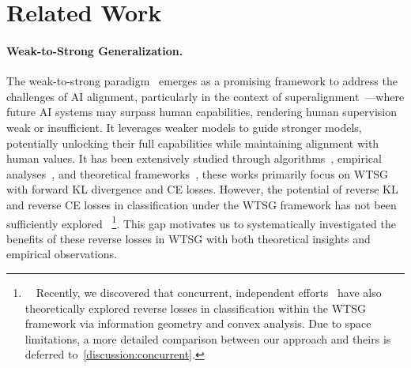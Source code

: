 \section{Related Work}

\paragraph{Weak-to-Strong Generalization.}
The weak-to-strong paradigm~\citep{burns2023weak} emerges as a promising framework to address the challenges of AI alignment, particularly in the context of superalignment~\citep{openai_superalignment}—where future AI systems may surpass human capabilities, rendering human supervision weak or insufficient. 
It leverages weaker models to guide stronger models, potentially unlocking their full capabilities while maintaining alignment with human values.
It has been extensively studied through algorithms~\citep{zhu2024weak,agrawal2024ensemw2s,sang2024improving,guo2024improving}, empirical analyses~\citep{yang2024super,ye2024weak}, and theoretical frameworks~\citep{lang2024theoretical,somerstep2024statistical,wu2024provable,charikar2024quantifying,yao2025understanding}, these works primarily focus on WTSG with forward KL divergence and CE losses. 
However, the potential of reverse KL and reverse CE losses in classification under the WTSG framework has not been sufficiently explored~\textsuperscript{\textdagger}
\footnote{\textdagger \ \ Recently, we discovered that concurrent, independent efforts~\citep{mulgund2025relating} have also theoretically explored reverse losses in classification within the WTSG framework via information geometry and convex analysis. Due to space limitations, a more detailed comparison between our approach and theirs is deferred to~\cref{discussion:concurrent}.}.
This gap motivates us to systematically investigated the benefits of these reverse losses in WTSG with both theoretical insights and empirical observations.







